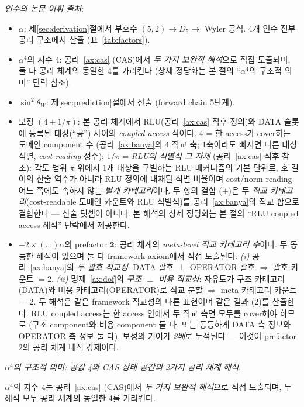 \documentclass[entropy,article,submit,pdftex,oneauthor]{Definitions/mdpi}
\begin{document}
\emph{인수의 논문 어휘 출처}:
\begin{itemize}
\item $\alpha$: 제\ref{sec:derivation}절에서 부호수 $(5,2) \to D_5 \to$ Wyler 공식. 4개 인수 전부 공리 구조에서 산출 (표~\ref{tab:factors}).
\item $\alpha^4$의 지수 $4$: 공리~\ref{ax:cas} (CAS)에서 \emph{두 가지 보완적 해석}으로 직접 도출되며, 둘 다 공리 체계의 동일한 4를 가리킨다 (상세 정당화는 본 절의 ``$\alpha^4$의 구조적 의미'' 단락 참조).
\item $\sin^2\theta_W$: 제\ref{sec:prediction}절에서 산출 (forward chain 5단계).
\item 보정 $(4 + 1/\pi)$: 본 공리 체계에서 RLU(공리~\ref{ax:cas} 직후 정의)와 DATA 슬롯에 등록된 대상(``공'') 사이의 \emph{coupled access} 식이다. $4$ = 한 access가 cover하는 도메인 component 수 (공리~\ref{ax:banya}의 4 직교 축; 1축이라도 빠지면 다른 대상 식별, \emph{cost reading} 정수); $1/\pi$ = \emph{RLU의 식별식 그 자체} (공리~\ref{ax:cas} 직후 참조): 각도 범위 $\pi$ 위에서 1개 대상을 구별하는 RLU 메커니즘의 기본 단위로, 호 길이의 산술 역수가 아니라 RLU 정의에 내재된 식별 비율이며 cost/norm reading 어느 쪽에도 속하지 않는 \emph{별개 카테고리}이다. 두 항의 결합 ($+$)은 두 \emph{직교 카테고리}(cost-readable 도메인 카운트와 RLU 식별식)를 공리~\ref{ax:banya}의 직교 합으로 결합한다 --- 산술 덧셈이 아니다. 본 해석의 상세 정당화는 본 절의 ``RLU coupled access 해석'' 단락에서 제공한다.
\item $-2 \times (\ldots) \alpha$의 prefactor $\mathbf{2}$: 공리 체계의 \emph{meta-level 직교 카테고리 수}이다. 두 동등한 해석이 있으며 둘 다 framework axiom에서 직접 도출된다: \emph{(i)} 공리~\ref{ax:banya}의 \emph{두 괄호 직교성}: DATA 괄호 $\perp$ OPERATOR 괄호 $\Rightarrow$ 괄호 카운트 $= 2$. \emph{(ii)} 명제~\ref{ax:dof}의 \emph{구조 $\perp$ 비용 직교성}: 자유도가 구조 카테고리(DATA)와 비용 카테고리(OPERATOR)로 직교 분할 $\Rightarrow$ meta 카테고리 카운트 $= 2$. 두 해석은 같은 framework 직교성의 다른 표현이며 같은 결과 ($2$)를 산출한다. RLU coupled access는 한 access 안에서 두 직교 측면 모두를 cover해야 하므로 (구조 component와 비용 component 둘 다, 또는 동등하게 DATA 측 정보와 OPERATOR 측 정보 둘 다), 보정의 기여가 \emph{2배}로 누적된다 --- 이것이 prefactor $2$의 공리 체계 내적 강제이다.
\end{itemize}

\emph{$\alpha^4$의 구조적 의미: 공값 4와 CAS 상태 공간의 2가지 공리 체계 해석}.

$\alpha^4$의 지수 $4$는 공리~\ref{ax:cas} (CAS)에서 \emph{두 가지 보완적 해석}으로 직접 도출되며, 두 해석 모두 공리 체계의 동일한 4를 가리킨다.
\end{document}
